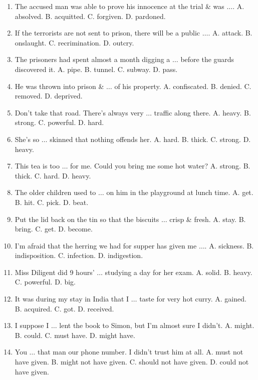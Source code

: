 \documentclass{article}
\numberwithin{equation}{section}
\begin{document}
\begin{enumerate}[leftmargin=8mm]
	\item The accused man was able to prove his innocence at the trial \& was $\ldots$. {\sf A.} absolved. {\sf B.} acquitted. {\sf C.} forgiven. {\sf D.} pardoned.
	\item If the terrorists are not sent to prison, there will be a public $\ldots$. {\sf A.} attack. {\sf B.} onslaught. {\sf C.} recrimination. {\sf D.} outcry.
	\item The prisoners had spent almost a month digging a $\ldots$ before the guards discovered it. {\sf A.} pipe. {\sf B.} tunnel. {\sf C.} subway. {\sf D.} pass.
	\item He was thrown into prison \& $\ldots$ of his property. {\sf A.} confiscated. {\sf B.} denied. {\sf C.} removed. {\sf D.} deprived.
	\item Don't take that road. There's always very $\ldots$ traffic along there. {\sf A.} heavy. {\sf B.} strong. {\sf C.} powerful. {\sf D.} hard.
	\item She's so $\ldots$ skinned that nothing offends her. {\sf A.} hard. {\sf B.} thick. {\sf C.} strong. {\sf D.} heavy.
	\item This tea is too $\ldots$ for me. Could you bring me some hot water? {\sf A.} strong. {\sf B.} thick. {\sf C.} hard. {\sf D.} heavy.
	\item The older children used to $\ldots$ on him in the playground at lunch time. {\sf A.} get. {\sf B.} hit. {\sf C.} pick. {\sf D.} beat.
	\item Put the lid back on the tin so that the biscuits $\ldots$ crisp \& fresh. {\sf A.} stay. {\sf B.} bring. {\sf C.} get. {\sf D.} become.
	\item I'm afraid that the herring we had for supper has given me $\ldots$. {\sf A.} sickness. {\sf B.} indisposition. {\sf C.} infection. {\sf D.} indigestion.
	\item Miss Diligent did 9 hours' $\ldots$ studying a day for her exam. {\sf A.} solid. {\sf B.} heavy. {\sf C.} powerful. {\sf D.} big.
	\item It was during my stay in India that I $\ldots$ taste for very hot curry. {\sf A.} gained. {\sf B.} acquired. {\sf C.} got. {\sf D.} received.
	\item I suppose I $\ldots$ lent the book to Simon, but I'm almost sure I didn't. {\sf A.} might. {\sf B.} could. {\sf C.} must have. {\sf D.} might have.
	\item You $\ldots$ that man our phone number. I didn't trust him at all. {\sf A.} must not have given. {\sf B.} might not have given. {\sf C.} should not have given. {\sf D.} could not have given.

\end{enumerate}
\end{document}
